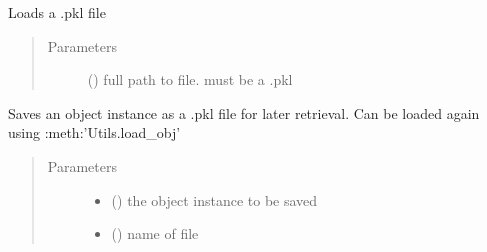 \documentclass[letterpaper,10pt,english]{sphinxmanual}
\begin{document}

\begin{fulllineitems}
\label{\detokenize{utils:utils.load_obj}}
Loads a .pkl file
\begin{quote}\begin{description}
\item[{Parameters}] \leavevmode
{} () \textendash{} full path to file. must be a .pkl

\end{description}\end{quote}

\end{fulllineitems}


\begin{fulllineitems}
\label{\detokenize{utils:utils.save_obj}}
Saves an object instance as a .pkl file for later retrieval. Can be loaded again using :meth:’Utils.load\_obj’
\begin{quote}\begin{description}
\item[{Parameters}] \leavevmode\begin{itemize}
\item {} 
 () \textendash{} the object instance to be saved

\item {} 
 () \textendash{} name of file

\end{itemize}

\end{description}\end{quote}

\end{fulllineitems}

\end{document}
